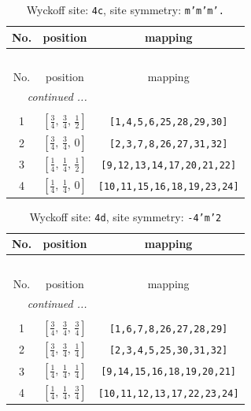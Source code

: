 \documentclass[fleqn,8pt]{jsarticle}
\begin{document}
\renewcommand{\arraystretch}{1.2}
\begin{longtable}{ccc}
\caption{Wyckoff site: {\tt 4c}, site symmetry: {\tt m'm'm'.}}
 \\
 \hline \hline
No. & position & mapping \\ \hline \endfirsthead

\multicolumn{2}{l}{\tablename\ \thetable{}} \\
 \hline \hline
No. & position & mapping \\ \hline \endhead

 \hline \hline
\multicolumn{2}{r}{\footnotesize\it continued ...} \\ \endfoot

 \hline \hline
\multicolumn{2}{r}{} \\ \endlastfoot

1 & $\left[ \frac{3}{4},\, \frac{3}{4},\, \frac{1}{2} \right]$ & {\tt [1,4,5,6,25,28,29,30]} \\ \hline
2 & $\left[ \frac{3}{4},\, \frac{3}{4},\, 0 \right]$ & {\tt [2,3,7,8,26,27,31,32]} \\ \hline
3 & $\left[ \frac{1}{4},\, \frac{1}{4},\, \frac{1}{2} \right]$ & {\tt [9,12,13,14,17,20,21,22]} \\ \hline
4 & $\left[ \frac{1}{4},\, \frac{1}{4},\, 0 \right]$ & {\tt [10,11,15,16,18,19,23,24]} \\
\end{longtable}
\renewcommand{\arraystretch}{1.2}
\begin{longtable}{ccc}
\caption{Wyckoff site: {\tt 4d}, site symmetry: {\tt -4'm'2}}
 \\
 \hline \hline
No. & position & mapping \\ \hline \endfirsthead

\multicolumn{2}{l}{\tablename\ \thetable{}} \\
 \hline \hline
No. & position & mapping \\ \hline \endhead

 \hline \hline
\multicolumn{2}{r}{\footnotesize\it continued ...} \\ \endfoot

 \hline \hline
\multicolumn{2}{r}{} \\ \endlastfoot

1 & $\left[ \frac{3}{4},\, \frac{3}{4},\, \frac{3}{4} \right]$ & {\tt [1,6,7,8,26,27,28,29]} \\ \hline
2 & $\left[ \frac{3}{4},\, \frac{3}{4},\, \frac{1}{4} \right]$ & {\tt [2,3,4,5,25,30,31,32]} \\ \hline
3 & $\left[ \frac{1}{4},\, \frac{1}{4},\, \frac{1}{4} \right]$ & {\tt [9,14,15,16,18,19,20,21]} \\ \hline
4 & $\left[ \frac{1}{4},\, \frac{1}{4},\, \frac{3}{4} \right]$ & {\tt [10,11,12,13,17,22,23,24]} \\
\end{longtable}
\end{document}
